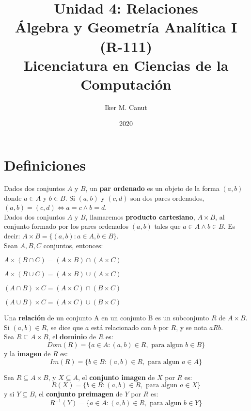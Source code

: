 \documentclass[11pt,a4paper]{article}
\author{Iker M. Canut}
\title{Unidad 4: Relaciones\\\'Algebra y Geometr\'ia Anal\'itica I (R-111)\\Licenciatura en Ciencias de la Computaci\'on}
\date{2020}
\begin{document}
\maketitle
\newpage

\section{Definiciones}
Dados dos conjuntos $A$ y $B$, un \textbf{par ordenado} es un objeto de la forma $(a,b)$ donde $a \in A$ y $b \in B$. Si $(a,b)$ y $(c,d)$ son dos pares ordenados, $(a,b) = (c,d) \iff a=c \land b=d$.\\

Dados dos conjuntos $A$ y $B$, llamaremos \textbf{producto cartesiano}, $A\times B$, al conjunto formado por los pares ordenados $(a,b)$ tales que $a\in A \land b\in B$. Es decir: $A\times B = \{(a,b):a\in A, b\in B\}$.\\

Sean $A,B, C$ conjuntos, entonces:
\begin{itemize}
\begin{multicols}{2}
\item $A \times (B \cap C) = (A \times B) \cap (A \times C)$
\item $A \times (B \cup C) = (A \times B) \cup (A \times C)$
\item $(A \cap B) \times C = (A \times C) \cap (B \times C)$
\item $(A \cup B) \times C = (A \times C) \cup (B \times C)$
\end{multicols}
\end{itemize}

\noindent \dotfill

Una \textbf{relaci\'on} de un conjunto A en un conjunto B es un subconjunto $R$ de $A \times B$. Si $(a,b) \in R$, se dice que $a$ est\'a relacionado con $b$ por $R$, y se nota $aRb$.\\

Sea $R \subseteq A \times B$, el \textbf{dominio} de $R$ es:
$$Dom(R) = \{ a \in A:(a,b) \in R, \text{ para algun } b\in B \}$$
\indent y la \textbf{imagen} de $R$ es:
$$Im(R) = \{ b\in B : (a,b)\in R, \text{ para algun } a \in A \}$$
\noindent \dotfill

Sea $R \subseteq A \times B$, y $X \subseteq A$, el \textbf{conjunto imagen} de $X$ por $R$ es:
$$R(X) = \{ b\in B : (a,b) \in R, \text{ para algun } a \in X \}$$
\indent y si $Y \subseteq B$, el \textbf{conjunto preimagen} de $Y$ por $R$ es:
$$R^{-1}(Y) = \{ a\in A : (a,b) \in R, \text{ para algun } b \in Y \}$$
\end{document}
